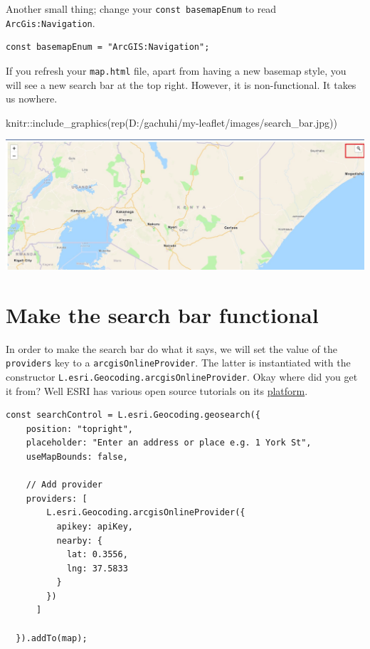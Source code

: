 \documentclass[
]{book}
\newenvironment{Shaded}{\begin{snugshade}}{\end{snugshade}}
\newcommand{\FunctionTok}[1]{\textcolor[rgb]{0.00,0.00,0.00}{#1}}
\newcommand{\NormalTok}[1]{#1}
\newcommand{\SpecialCharTok}[1]{\textcolor[rgb]{0.00,0.00,0.00}{#1}}
\newcommand{\StringTok}[1]{\textcolor[rgb]{0.31,0.60,0.02}{#1}}
\begin{document}
Another small thing; change your \texttt{const\ basemapEnum} to read \texttt{ArcGis:Navigation}.

\begin{verbatim}
const basemapEnum = "ArcGIS:Navigation";
\end{verbatim}

If you refresh your \texttt{map.html} file, apart from having a new basemap style, you will see a new search bar at the top right. However, it is non-functional. It takes us nowhere.

\begin{Shaded}
\begin{Highlighting}[]
\NormalTok{knitr}\SpecialCharTok{::}\FunctionTok{include\_graphics}\NormalTok{(}\FunctionTok{rep}\NormalTok{(}\StringTok{\textquotesingle{}D:/gachuhi/my{-}leaflet/images/search\_bar.jpg\textquotesingle{}}\NormalTok{))}
\end{Highlighting}
\end{Shaded}

\includegraphics[width=26.19in]{../images/search_bar}

\hypertarget{make-the-search-bar-functional}{%
\section{Make the search bar functional}\label{make-the-search-bar-functional}}

In order to make the search bar do what it says, we will set the value of the \texttt{providers} key to a \texttt{arcgisOnlineProvider}. The latter is instantiated with the constructor \texttt{L.esri.Geocoding.arcgisOnlineProvider}. Okay where did you get it from? Well ESRI has various open source tutorials on its \href{https://developers.arcgis.com/esri-leaflet/geocode-and-search/search-for-an-address/?utm_source=pocket_saves}{platform}.

\begin{verbatim}
const searchControl = L.esri.Geocoding.geosearch({
    position: "topright",
    placeholder: "Enter an address or place e.g. 1 York St",
    useMapBounds: false,

    // Add provider
    providers: [
        L.esri.Geocoding.arcgisOnlineProvider({
          apikey: apiKey,
          nearby: {
            lat: 0.3556,
            lng: 37.5833
          }
        })
      ]

  }).addTo(map);
  
\end{verbatim}
\end{document}
